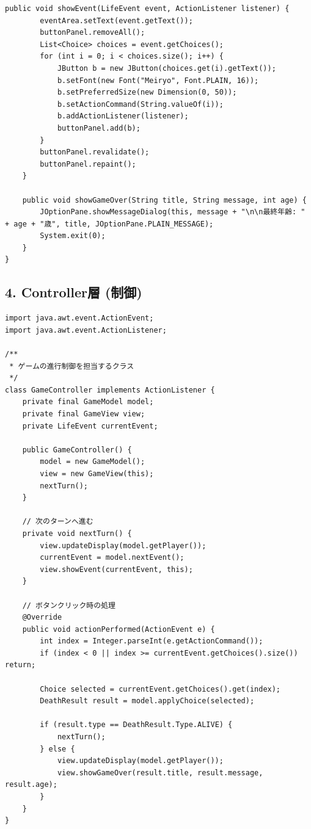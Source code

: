 \documentclass[a4paper,11pt]{jsarticle}
\begin{document}
\begin{lstlisting}[caption=GameView.java]
    public void showEvent(LifeEvent event, ActionListener listener) {
        eventArea.setText(event.getText());
        buttonPanel.removeAll();
        List<Choice> choices = event.getChoices();
        for (int i = 0; i < choices.size(); i++) {
            JButton b = new JButton(choices.get(i).getText());
            b.setFont(new Font("Meiryo", Font.PLAIN, 16));
            b.setPreferredSize(new Dimension(0, 50));
            b.setActionCommand(String.valueOf(i));
            b.addActionListener(listener);
            buttonPanel.add(b);
        }
        buttonPanel.revalidate();
        buttonPanel.repaint();
    }

    public void showGameOver(String title, String message, int age) {
        JOptionPane.showMessageDialog(this, message + "\n\n最終年齢: " + age + "歳", title, JOptionPane.PLAIN_MESSAGE);
        System.exit(0);
    }
}
\end{lstlisting}

\subsection*{4. Controller層 (制御)}
\begin{lstlisting}[caption=GameController.java]
import java.awt.event.ActionEvent;
import java.awt.event.ActionListener;

/**
 * ゲームの進行制御を担当するクラス
 */
class GameController implements ActionListener {
    private final GameModel model;
    private final GameView view;
    private LifeEvent currentEvent;

    public GameController() {
        model = new GameModel();
        view = new GameView(this);
        nextTurn();
    }

    // 次のターンへ進む
    private void nextTurn() {
        view.updateDisplay(model.getPlayer());
        currentEvent = model.nextEvent();
        view.showEvent(currentEvent, this);
    }

    // ボタンクリック時の処理
    @Override
    public void actionPerformed(ActionEvent e) {
        int index = Integer.parseInt(e.getActionCommand());
        if (index < 0 || index >= currentEvent.getChoices().size()) return;

        Choice selected = currentEvent.getChoices().get(index);
        DeathResult result = model.applyChoice(selected);

        if (result.type == DeathResult.Type.ALIVE) {
            nextTurn();
        } else {
            view.updateDisplay(model.getPlayer());
            view.showGameOver(result.title, result.message, result.age);
        }
    }
}
\end{lstlisting}
\end{document}
